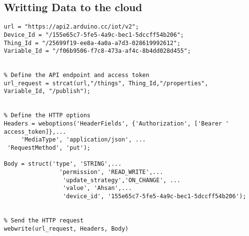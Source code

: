 \subsection*{Writting Data to the cloud}
\label{WRITTING TO THE CLOUD}
\begin{lstlisting}[style=Matlab-Pyglike]
%:::::::::::::::WRITTING TO THE CLOUD:::::::::::::::
url = "https://api2.arduino.cc/iot/v2";
Device_Id = "/155e65c7-5fe5-4a9c-bec1-5dccff54b206";
Thing_Id = "/25699f19-ee8a-4a0a-a7d3-028619992612";
Variable_Id = "/f06b9506-f7c8-473a-af4c-8b4dd028d455";


% Define the API endpoint and access token
url_request = strcat(url,"/things", Thing_Id,"/properties", Variable_Id, "/publish");


% Define the HTTP options
Headers = weboptions('HeaderFields', {'Authorization', ['Bearer ' access_token]},...
     'MediaType', 'application/json', ...
 'RequestMethod', 'put'); 

Body = struct('type', 'STRING',...
                'permission', 'READ_WRITE',...
                 'update_strategy','ON_CHANGE', ...
                 'value', 'Ahsan',...
                 'device_id', '155e65c7-5fe5-4a9c-bec1-5dccff54b206');


% Send the HTTP request
webwrite(url_request, Headers, Body)
\end{lstlisting}
